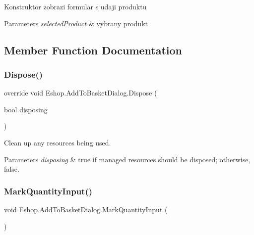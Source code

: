 Konstruktor zobrazi formular s udaji produktu 


\begin{DoxyParams}{Parameters}
{\em selected\+Product} & vybrany produkt\\
\hline
\end{DoxyParams}


\subsection{Member Function Documentation}
\mbox{\label{class_eshop_1_1_add_to_basket_dialog_afadad243091fafb1c754033174fbe0c4}} 
\subsubsection{\texorpdfstring{Dispose()}{Dispose()}}
{\footnotesize\ttfamily override void Eshop.\+Add\+To\+Basket\+Dialog.\+Dispose (\begin{DoxyParamCaption}\item[{bool}]{disposing }\end{DoxyParamCaption})\hspace{0.3cm}{\ttfamily [protected]}}



Clean up any resources being used. 


\begin{DoxyParams}{Parameters}
{\em disposing} & true if managed resources should be disposed; otherwise, false.\\
\hline
\end{DoxyParams}
\mbox{\label{class_eshop_1_1_add_to_basket_dialog_a5e2401aa42ee16c67773746bd0d8e882}} 
\subsubsection{\texorpdfstring{MarkQuantityInput()}{MarkQuantityInput()}}
{\footnotesize\ttfamily void Eshop.\+Add\+To\+Basket\+Dialog.\+Mark\+Quantity\+Input (\begin{DoxyParamCaption}{ }\end{DoxyParamCaption})}



